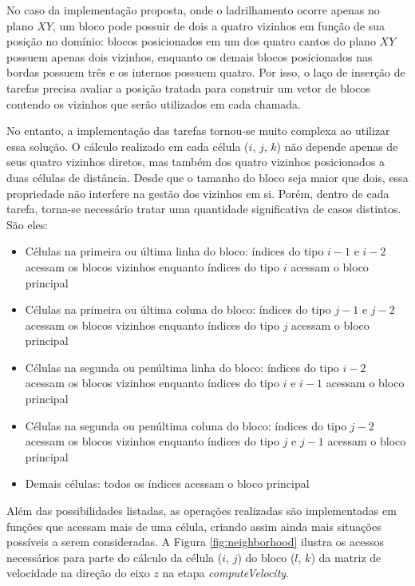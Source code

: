 \documentclass[cic,tc]{iiufrgs}
\begin{document}
No caso da implementação proposta, onde o ladrilhamento ocorre apenas no plano $XY$, um bloco pode possuir de dois a quatro vizinhos
em função de sua posição no domínio: blocos posicionados em um dos quatro cantos do plano $XY$ possuem apenas dois vizinhos, enquanto
os demais blocos posicionados nas bordas possuem três e os internos possuem quatro. Por isso, o laço de inserção de tarefas precisa
avaliar a posição tratada para construir um vetor de blocos contendo os vizinhos que serão utilizados em cada chamada.

No entanto, a implementação das tarefas tornou-se muito complexa ao utilizar essa solução. O cálculo realizado em cada célula ($i$, $j$, $k$)
não depende apenas de seus quatro vizinhos diretos, mas também dos quatro vizinhos posicionados a duas células de distância. Desde que o tamanho
do bloco seja maior que dois, essa propriedade não interfere na gestão dos vizinhos em si. Porém, dentro de cada tarefa, torna-se
necessário tratar uma quantidade significativa de casos distintos. São eles:

\begin{itemize}
\item{Células na primeira ou última linha do bloco:} índices do tipo $i - 1$ e $i - 2$ acessam os blocos vizinhos enquanto índices do tipo $i$ acessam o bloco principal 
\item{Células na primeira ou última coluna do bloco:} índices do tipo $j - 1$ e $j - 2$ acessam os blocos vizinhos enquanto índices do tipo $j$ acessam o bloco principal
\item{Células na segunda ou penúltima linha do bloco:} índices do tipo $i - 2$ acessam os blocos vizinhos enquanto índices do tipo $i$ e $i - 1$ acessam o bloco principal
\item{Células na segunda ou penúltima coluna do bloco:} índices do tipo $j - 2$ acessam os blocos vizinhos enquanto índices do tipo $j$ e $j - 1$ acessam o bloco principal
\item{Demais células:} todos os índices acessam o bloco principal
\end{itemize}

Além das possibilidades listadas, as operações realizadas são implementadas em funções que acessam mais de uma célula, criando assim
ainda mais situações possíveis a serem consideradas. A Figura \ref{fig:neighborhood} ilustra os acessos necessários para parte do cálculo
da célula ($i$, $j$) do bloco ($l$, $k$) da matriz de velocidade na direção do eixo $z$ na etapa \textit{computeVelocity}.
\end{document}
